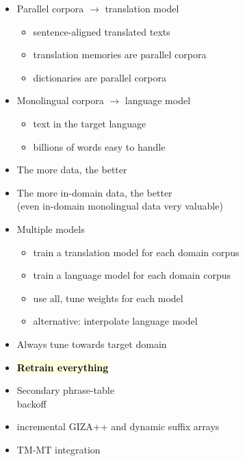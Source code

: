 \documentclass[landscape]{uedslides2C}
\newcommand{\currenttopic}[1]{\colorbox{lightyellow}{\textcolor{black}{\bf #1}}}
\begin{document}
\vspace{15mm}
\begin{itemize}
\item Parallel corpora $\rightarrow$ translation model
\begin{itemize}
\item sentence-aligned translated texts
\item translation memories are parallel corpora
\item dictionaries are parallel corpora
\end{itemize}
\item Monolingual corpora $\rightarrow$ language model
\begin{itemize}
\item text in the target language
\item billions of words easy to handle
\end{itemize}
\end{itemize}


\vspace{10mm}
\begin{itemize}
\item The more data, the better
\item The more in-domain data, the better\\
(even in-domain monolingual data very valuable)
\item Multiple models 
\begin{itemize}
\item train a translation model for each domain corpus
\item train a language model for each domain corpus
\item use all, tune weights for each model
\item alternative: interpolate language model
\end{itemize}
\item Always tune towards target domain
\end{itemize}


\begin{itemize}
\item \currenttopic{Retrain everything}
\item Secondary phrase-table
  \\ backoff
\item  incremental GIZA++ and dynamic suffix arrays
\item TM-MT integration

\end{itemize}
\end{document}
